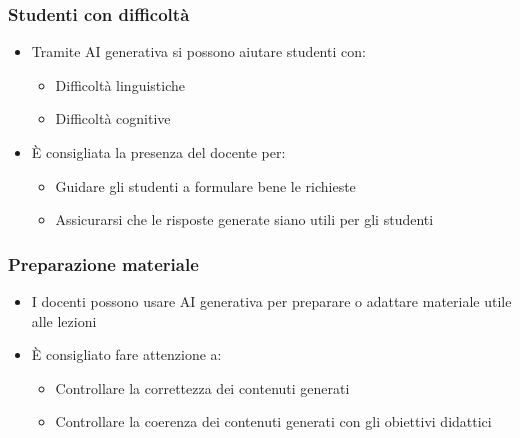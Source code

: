 \begin{contentframe}
    \frametitle{Studenti con difficoltà}

    \begin{itemize}
        \item Tramite AI generativa si possono aiutare studenti con:
        \begin{itemize}
            \item Difficoltà linguistiche
            \item Difficoltà cognitive
        \end{itemize}

        \bigskip
        \item È consigliata la presenza del docente per:
        \begin{itemize}
            \item Guidare gli studenti a formulare bene le richieste
            \item Assicurarsi che le risposte generate siano utili per gli studenti
        \end{itemize}
    \end{itemize}
\end{contentframe}

\begin{contentframe}
    \frametitle{Preparazione materiale}

    \begin{itemize}
        \item I docenti possono usare AI generativa per preparare o adattare materiale utile alle lezioni

        \bigskip
        \item È consigliato fare attenzione a:
        \begin{itemize}
            \item Controllare la correttezza dei contenuti generati
            \item Controllare la coerenza dei contenuti generati con gli obiettivi didattici
        \end{itemize}
    \end{itemize}
\end{contentframe}

